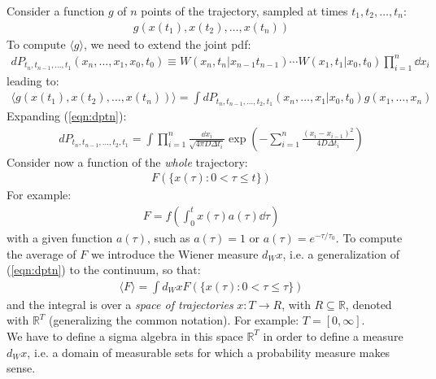 \documentclass[../template.tex]{subfiles}
\begin{document}
Consider a function $g$ of $n$ points of the trajectory, sampled at times $t_1, t_2, \dots, t_n$:
\begin{align*}
    g(x(t_1 ), x(t_2 ), \dots, x(t_n))
\end{align*}   
To compute $\langle g \rangle$, we need to extend the joint pdf:
\begin{align}
    dP_{t_n, t_{n-1}, \dots, t_1} (x_n,\dots, x_1, x_0, t_0) \equiv W(x_n, t_n |x_{n-1}t_{n-1}) \cdots W(x_1, t_1|x_0, t_0) \prod_{i=1}^n \dd{x_i}
    \label{eqn:dptn}
\end{align} 
leading to:
\begin{align*}
    \langle g(x(t_1 ), x(t_2), \dots, x(t_n)) \rangle = \int dP_{t_n, t_{n-1}, \dots, t_2, t_1} (x_n, \dots, x_1|x_0, t_0) g(x_1, \dots, x_n)
\end{align*}
Expanding (\ref{eqn:dptn}):
\begin{align*}
    dP_{t_n, t_{n-1}, \dots, t_2, t_1} = \int \prod_{i=1}^n \frac{\dd{x_i}}{\sqrt{4 \pi D \Delta t_i}} \exp\left(-\sum_{i=1}^n \frac{(x_i - x_{i-1})^2}{4 D \Delta t_i} \right) 
\end{align*}
Consider now a function of the \textit{whole} trajectory:
\begin{align*}
    F(\{x(\tau) \colon 0 < \tau \leq t \})
\end{align*} 
For example:
\begin{align*}
    F = f\left(\int_0^t x(\tau) a(\tau) \dd{\tau}\right)
\end{align*}
with a given function $a(\tau)$, such as $a(\tau) = 1$ or $a(\tau) = e^{-\tau/\tau_0}$. To compute the average of $F$ we introduce the Wiener measure $d_W x$, i.e. a generalization of (\ref{eqn:dptn}) to the continuum, so that:
\begin{align*}
    \langle F \rangle = \int d_W x F(\{x(\tau)\colon 0 < \tau \leq \tau\})
\end{align*}
and the integral is over a \textit{space of trajectories} $x\colon T \to R$, with $R \subseteq \mathbb{R}$, denoted with $\mathbb{R}^T$ (generalizing the common notation). For example: $T = [0, \infty]$.\\

We have to define a sigma algebra in this space $\mathbb{R}^T$ in order to define a measure $d_W x$, i.e. a domain of measurable sets for which a probability measure makes sense.\\ %
\end{document}
